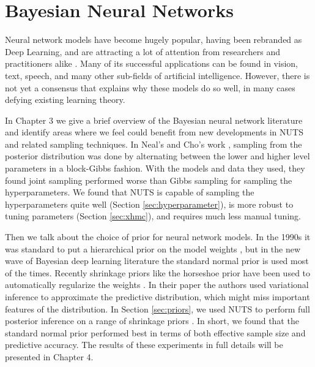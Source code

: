 \documentclass[12pt]{report}
\begin{document}
\section{Bayesian Neural Networks}

Neural network models have become hugely popular, having been rebranded as Deep Learning, and are attracting a lot of attention from researchers and practitioners alike \cite{goodfellow2016deep}. Many of its successful applications can be found in vision, text, speech, and many other sub-fields of artificial intelligence. However, there is not yet a consensus that explains why these models do so well, in many cases defying existing learning theory. 


In Chapter 3 we give a brief overview of the Bayesian neural network literature and identify areas where we feel could benefit from new developments in NUTS and related sampling techniques. In Neal's and Cho's work \cite{neal2012bayesian,choo2000learning}, sampling from the posterior distribution was done by alternating between the lower and higher level parameters in a block-Gibbs fashion. With the models and data they used, they found joint sampling performed worse than Gibbs sampling for sampling the hyperparameters. We found that NUTS is capable of sampling the hyperparameters quite well (Section \ref{sec:hyperparameter}), is more robust to tuning parameters (Section \ref{sec:xhmc}), and requires much less manual tuning.

Then we talk about the choice of prior for neural network models. In the 1990s it was standard to put a hierarchical prior on the model weights , but in the new wave of Bayesian deep learning literature the standard normal prior is used most of the times. Recently shrinkage priors like the horseshoe prior have been used to automatically regularize the weights \cite{ghosh2017model}. In their paper the authors used variational inference to approximate the predictive distribution, which might miss important features of the  distribution. In Section \ref{sec:priors}, we used NUTS to perform full posterior inference on a range of shrinkage priors . In short, we found that the standard normal prior performed best in terms of both effective sample size and predictive accuracy. The results of these experiments in full details will be presented in Chapter 4.
\end{document}

